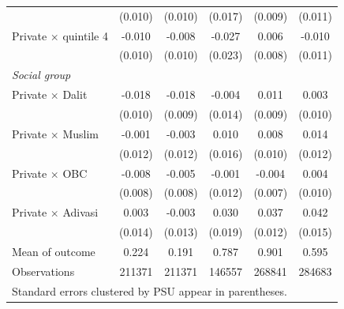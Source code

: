 {\begin{tabular}{l*{5}{c}}
            &     (0.010)         &     (0.010)         &     (0.017)         &     (0.009)         &     (0.011)         \\
\addlinespace
Private $\times$ quintile 4&      -0.010         &      -0.008         &      -0.027         &       0.006         &      -0.010         \\
            &     (0.010)         &     (0.010)         &     (0.023)         &     (0.008)         &     (0.011)         \\
\addlinespace
\textit{Social group}&                     &                     &                     &                     &                     \\
\addlinespace
Private $\times$ Dalit&      -0.018\sym{*}  &      -0.018\sym{*}  &      -0.004         &       0.011         &       0.003         \\
            &     (0.010)         &     (0.009)         &     (0.014)         &     (0.009)         &     (0.010)         \\
\addlinespace
Private $\times$ Muslim&      -0.001         &      -0.003         &       0.010         &       0.008         &       0.014         \\
            &     (0.012)         &     (0.012)         &     (0.016)         &     (0.010)         &     (0.012)         \\
\addlinespace
Private $\times$ OBC&      -0.008         &      -0.005         &      -0.001         &      -0.004         &       0.004         \\
            &     (0.008)         &     (0.008)         &     (0.012)         &     (0.007)         &     (0.010)         \\
\addlinespace
Private $\times$ Adivasi&       0.003         &      -0.003         &       0.030         &       0.037\sym{***}&       0.042\sym{***}\\
            &     (0.014)         &     (0.013)         &     (0.019)         &     (0.012)         &     (0.015)         \\
\midrule
Mean of outcome&       0.224         &       0.191         &       0.787         &       0.901         &       0.595         \\
Observations&      211371         &      211371         &      146557         &      268841         &      284683         \\
\bottomrule
\multicolumn{6}{l}{\footnotesize Standard errors clustered by PSU appear in parentheses.}\\

\end{tabular}}

